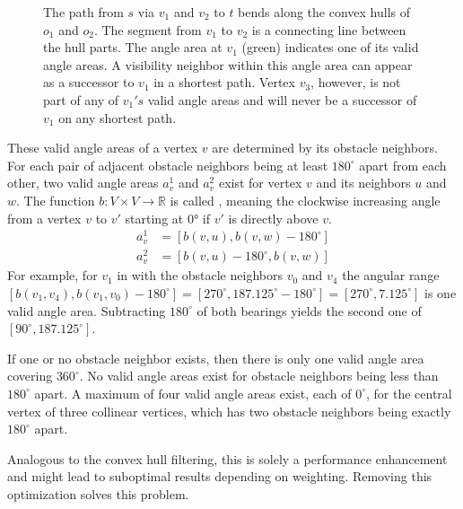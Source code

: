 \begin{figure}[h]
\begin{figcenter}
				\end{figcenter}
				\caption[Visualization of valid angle areas.]{
					The path from $s$ via $v_1$ and $v_2$ to $t$ bends along the convex hulls of $o_1$ and $o_2$.
					The segment from $v_1$ to $v_2$ is a connecting line between the hull parts.
					The angle area at $v_1$ (green) indicates one of its valid angle areas.
					A visibility neighbor within this angle area can appear as a successor to $v_1$ in a shortest path.
					Vertex $v_3$, however, is not part of any of $v_1's$ valid angle areas and will never be a successor of $v_1$ on any shortest path.
				}
				\label{fig:convex-hull}
			\end{figure}
			
			These valid angle areas of a vertex $v$ are determined by its obstacle neighbors.
			For each pair of adjacent obstacle neighbors being at least $180^\circ$ apart from each other, two valid angle areas $a_v^1$ and $a_v^2$ exist for vertex $v$ and its neighbors $u$ and $w$.
			The function $b: V \times V \rightarrow \mathbb{R}$ is called , meaning the clockwise increasing angle  from a vertex $v$ to $v'$ starting at 0° if $v'$ is directly above $v$.
			\begin{align*}
				a_v^1 &= [b(v, u), b(v, w) - 180^\circ] \\
				a_v^2 &= [b(v, u) - 180^\circ, b(v, w)]
			\end{align*}
			For example, for $v_1$ in  with the obstacle neighbors $v_0$ and $v_4$ the angular range $[b(v_1, v_4), b(v_1, v_0) - 180^\circ] = [270^\circ, 187.125^\circ - 180^\circ] = [270^\circ, 7.125^\circ]$ is one valid angle area.
			Subtracting $180^\circ$ of both bearings yields the second one of $[90^\circ, 187.125^\circ]$.
			
			If one or no obstacle neighbor exists, then there is only one valid angle area covering $360^\circ$.
			No valid angle areas exist for obstacle neighbors being less than $180^\circ$ apart.
			A maximum of four valid angle areas exist, each of $0^\circ$, for the central vertex of three collinear vertices, which has two obstacle neighbors being exactly $180^\circ$ apart.
			
			Analogous to the convex hull filtering, this is solely a performance enhancement and might lead to suboptimal results depending on weighting.
			Removing this optimization solves this problem.
			
